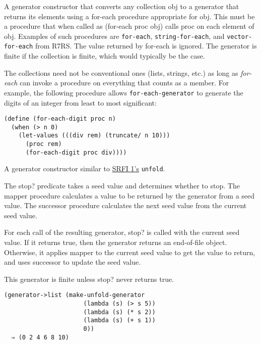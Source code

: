 \begin{entry}{%
  }

  A
  generator constructor that converts any collection obj to a
  generator that returns its elements using a for-each procedure
  appropriate for obj. This must be a procedure that when called as
  (for-each proc obj) calls proc on each element of obj. Examples of
  such procedures are \texttt{for-each}, \texttt{string-for-each}, and
  \texttt{vector-for-each} from R7RS. The value returned by for-each
  is ignored. The generator is finite if the collection is finite,
  which would typically be the case.

  The collections need not be conventional ones (lists, strings, etc.)
  as long as \emph{for-each} can invoke a procedure on everything that
  counts as a member. For example, the following procedure allows
  \texttt{for-each-generator} to generate the digits of an integer
  from least to most significant:

\begin{verbatim}
(define (for-each-digit proc n)
  (when (> n 0)
    (let-values (((div rem) (truncate/ n 10)))
      (proc rem)
      (for-each-digit proc div))))
\end{verbatim}
\end{entry}

\begin{entry}{%
  }

A generator constructor similar to
\href{http://srfi.schemers.org/srfi-1/srfi-1.html}{SRFI 1's}
\texttt{unfold}.

The stop? predicate takes a seed value and determines whether to stop.
The mapper procedure calculates a value to be returned by the generator
from a seed value. The successor procedure calculates the next seed
value from the current seed value.

For each call of the resulting generator, stop? is called with the
current seed value. If it returns true, then the generator returns an
end-of-file object. Otherwise, it applies mapper to the current seed
value to get the value to return, and uses successor to update the seed
value.

This generator is finite unless stop? never returns true.

\begin{verbatim}
(generator->list (make-unfold-generator
                      (lambda (s) (> s 5))
                      (lambda (s) (* s 2))
                      (lambda (s) (+ s 1))
                      0))
  ⇒ (0 2 4 6 8 10)
\end{verbatim}
\end{entry}

